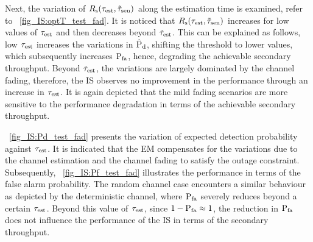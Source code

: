 {Next, the variation of $R_{\text{s}}(\tau_{\text{est}}, \tilde{\tau}_{\text{sen}})$ along the estimation time is examined, refer to \figurename~\ref{fig_IS:optT_test_fad}. It is noticed that $R_{\text{s}}(\tau_{\text{est}}, \tilde{\tau}_{\text{sen}})$ increases for low values of $\tau_{\text{est}}$ and then decreases beyond $\tilde{\tau}_{\text{est}}$. This can be explained as follows, low $\tau_{\text{est}}$ increases the variations in $\hat{\text{P}}_{\text{d}}$, shifting the threshold to lower values, which subsequently increases $\text{P}_{\text{fa}}$, hence, degrading the achievable secondary throughput. Beyond $\tilde{\tau}_{\text{est}}$, the variations are largely dominated by the channel fading, therefore, the IS observes no improvement in the performance through an increase in $\tau_{\text{est}}$. It is again depicted that the mild fading scenarios are more sensitive to the performance degradation in terms of the achievable secondary throughput. 

\figurename~\ref{fig_IS:Pd_test_fad} presents the variation of expected detection probability against $\tau_{\text{est}}$. It is indicated that the EM compensates for the variations due to the channel estimation and the channel fading to satisfy the outage constraint. Subsequently, \figurename~\ref{fig_IS:Pf_test_fad} illustrates the performance in terms of the false alarm probability. The random channel case encounters a similar behaviour as depicted by the deterministic channel, where $\text{P}_{\text{fa}}$ severely reduces beyond a certain $\tau_{\text{est}}$. Beyond this value of $\tau_{\text{est}}$, since $1 - \text{P}_{\text{fa}} \approx 1$, the reduction in $\text{P}_{\text{fa}}$ does not influence the performance of the IS in terms of the secondary throughput.  


\begin{figure}[!ht]
%

\centering
{}
\end{figure}}
